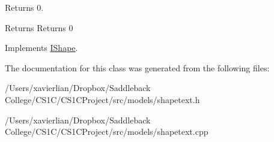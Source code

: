 Returns 0. 

\begin{DoxyReturn}{Returns}
Returns 0 
\end{DoxyReturn}


Implements \mbox{\hyperlink{class_i_shape_a485f6770c4e56b31c76d368b959b6f00}{I\+Shape}}.



The documentation for this class was generated from the following files\+:\begin{DoxyCompactItemize}
\item 
/\+Users/xavierlian/\+Dropbox/\+Saddleback College/\+C\+S1\+C/\+C\+S1\+C\+Project/src/models/shapetext.\+h\item 
/\+Users/xavierlian/\+Dropbox/\+Saddleback College/\+C\+S1\+C/\+C\+S1\+C\+Project/src/models/shapetext.\+cpp\end{DoxyCompactItemize}

